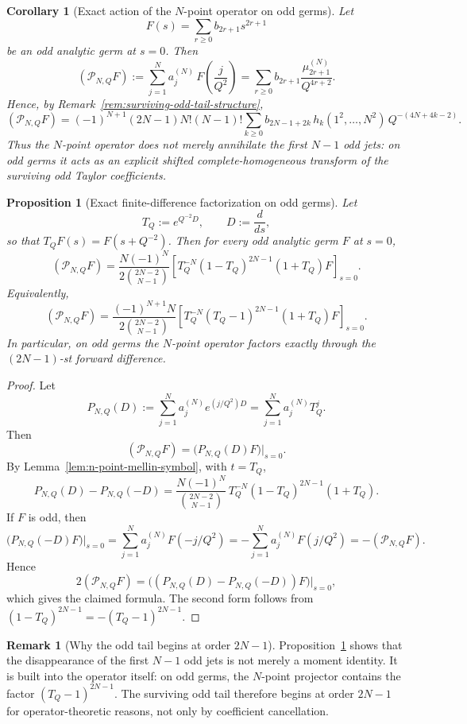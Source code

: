 \documentclass[11pt,a4paper]{amsart}
\theoremstyle{plain}
\newtheorem{proposition}[theorem]{Proposition}
\newtheorem{corollary}[theorem]{Corollary}
\theoremstyle{definition}
\newtheorem{remark}[theorem]{Remark}
\begin{document}
\begin{corollary}[Exact action of the $N$-point operator on odd germs]
\label{cor:n-point-exact-odd-action}
Let
\[
F(s)=\sum_{r\ge 0} b_{2r+1}s^{2r+1}
\]
be an odd analytic germ at $s=0$. Then
\[
(\mathcal P_{N,Q}F)
:=
\sum_{j=1}^N a_j^{(N)}\,F\!\left(\frac{j}{Q^2}\right)
=
\sum_{r\ge 0} b_{2r+1}\frac{\mu_{2r+1}^{(N)}}{Q^{4r+2}}.
\]
Hence, by Remark~\ref{rem:surviving-odd-tail-structure},
\[
(\mathcal P_{N,Q}F)
=
(-1)^{N+1}(2N-1)N!(N-1)!
\sum_{k\ge 0}
b_{2N-1+2k}\,
h_k(1^2,\dots,N^2)\,
Q^{-(4N+4k-2)}.
\]
Thus the $N$-point operator does not merely annihilate the first $N-1$
odd jets: on odd germs it acts as an explicit shifted complete-homogeneous
transform of the surviving odd Taylor coefficients.
\end{corollary}

\begin{proposition}[Exact finite-difference factorization on odd germs]
\label{prop:n-point-odd-finite-difference-factorization}
Let
\[
T_Q:=e^{Q^{-2}D},
\qquad
D:=\frac{d}{ds},
\]
so that $T_QF(s)=F(s+Q^{-2})$. Then for every odd analytic germ
$F$ at $s=0$,
\[
(\mathcal P_{N,Q}F)
=
\frac{N(-1)^N}{2\binom{2N-2}{N-1}}
\left[
T_Q^{-N}(1-T_Q)^{2N-1}(1+T_Q)F
\right]_{s=0}.
\]
Equivalently,
\[
(\mathcal P_{N,Q}F)
=
\frac{(-1)^{N+1}N}{2\binom{2N-2}{N-1}}
\left[
T_Q^{-N}(T_Q-1)^{2N-1}(1+T_Q)F
\right]_{s=0}.
\]
In particular, on odd germs the $N$-point operator factors exactly through
the $(2N-1)$-st forward difference.
\end{proposition}

\begin{proof}
Let
\[
P_{N,Q}(D):=\sum_{j=1}^N a_j^{(N)}e^{(j/Q^2)D}
=\sum_{j=1}^N a_j^{(N)}T_Q^j.
\]
Then
\[
(\mathcal P_{N,Q}F)=\bigl(P_{N,Q}(D)F\bigr)\big|_{s=0}.
\]
By Lemma~\ref{lem:n-point-mellin-symbol}, with $t=T_Q$,
\[
P_{N,Q}(D)-P_{N,Q}(-D)
=
\frac{N(-1)^N}{\binom{2N-2}{N-1}}\,
T_Q^{-N}(1-T_Q)^{2N-1}(1+T_Q).
\]
If $F$ is odd, then
\[
\bigl(P_{N,Q}(-D)F\bigr)\big|_{s=0}
=
\sum_{j=1}^N a_j^{(N)}F(-j/Q^2)
=
-\sum_{j=1}^N a_j^{(N)}F(j/Q^2)
=
-(\mathcal P_{N,Q}F).
\]
Hence
\[
2(\mathcal P_{N,Q}F)
=
\bigl((P_{N,Q}(D)-P_{N,Q}(-D))F\bigr)\big|_{s=0},
\]
which gives the claimed formula. The second form follows from
$(1-T_Q)^{2N-1}=-(T_Q-1)^{2N-1}$.
\end{proof}

\begin{remark}[Why the odd tail begins at order $2N-1$]
\label{rem:n-point-odd-tail-begins-by-factorization}
Proposition~\ref{prop:n-point-odd-finite-difference-factorization} shows that
the disappearance of the first $N-1$ odd jets is not merely a moment
identity. It is built into the operator itself: on odd germs, the
$N$-point projector contains the factor $(T_Q-1)^{2N-1}$. The surviving
odd tail therefore begins at order $2N-1$ for operator-theoretic reasons,
not only by coefficient cancellation.
\end{remark}
\end{document}
